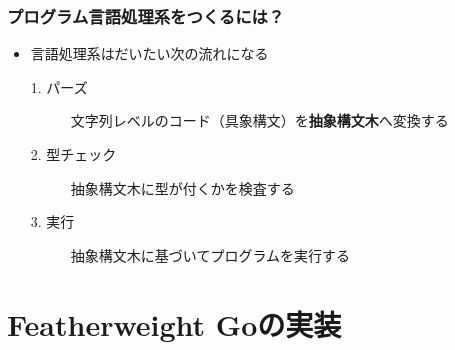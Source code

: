 \begin{frame}
  \frametitle{プログラム言語処理系をつくるには？}

  \pause
  \begin{itemize}
    \item<+-> 言語処理系はだいたい次の流れになる
    \begin{description}
      \item[1. パーズ] 文字列レベルのコード（具象構文）を\textbf{抽象構文木}へ変換する
      \item[2. 型チェック] 抽象構文木に型が付くかを検査する
      \item[3. 実行] 抽象構文木に基づいてプログラムを実行する
    \end{description}
  \end{itemize}


\end{frame}

\section{Featherweight Goの実装}

